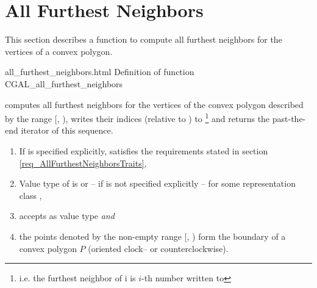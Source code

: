 
\clearpage
\section{All Furthest Neighbors}
\label{secAllFurthestNeighbors}
\cgalColumnLayout

This section describes a function to compute all furthest neighbors
for the vertices of a convex polygon. 

\ccHtmlNoClassToc
\begin{ccHtmlClassFile}{all_furthest_neighbors.html}
  {Definition of function CGAL_all_furthest_neighbors}
  

  \def\ccLongParamLayout{\ccTrue} 

  
  computes all furthest neighbors for the vertices of the convex
  polygon described by the range [,
  ), writes their indices (relative to
  ) to \footnote{i.e. the furthest neighbor
    of \ccc{points_begin[}i\ccc{]} is \ccc{points_begin[}$i$-th number
    written to \ccc{]}} and returns the past-the-end iterator
  of this sequence.

  \begin{enumerate}
  \item If  is specified explicitly,  satisfies the
    requirements stated in section \ref{req_AllFurthestNeighborsTraits},
  \item Value type of  is  or
    -- if  is not specified explicitly -- 
    for some representation class ,
  \item {} accepts  as value type
    \textit{and}
  \item the points denoted by the non-empty range [,
    ) form the boundary of a convex polygon $P$
    (oriented clock-- or counterclockwise).
  \end{enumerate}
  

\end{ccHtmlClassFile}
